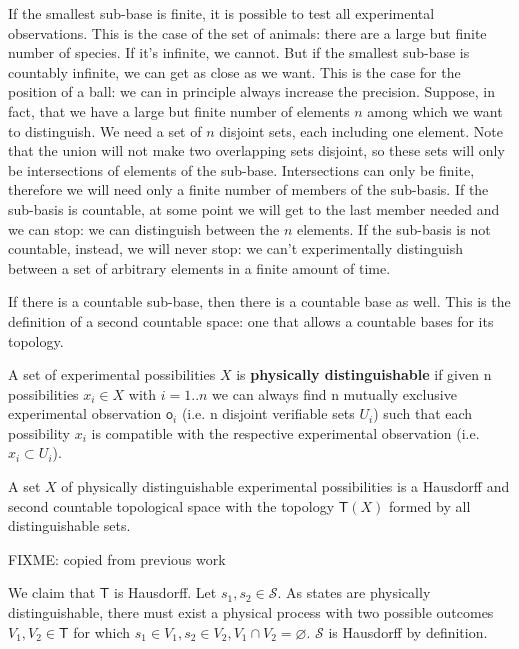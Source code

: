 \documentclass[11pt,letterpaper,fleqn]{memoir} %
\begin{document}
If the smallest sub-base is finite, it is possible to test all experimental observations. This is the case of the set of animals: there are a large but finite number of species. If it's infinite, we cannot. But if the smallest sub-base is countably infinite, we can get as close as we want. This is the case for the position of a ball: we can in principle always increase the precision. Suppose, in fact, that we have a large but finite number of elements $n$ among which we want to distinguish. We need a set of $n$ disjoint sets, each including one element. Note that the union will not make two overlapping sets disjoint, so these sets will only be intersections of elements of the sub-base. Intersections can only be finite, therefore we will need only a finite number of members of the sub-basis. If the sub-basis is countable, at some point we will get to the last member needed and we can stop: we can distinguish between the $n$ elements. If the sub-basis is not countable, instead, we will never stop: we can't experimentally distinguish between a set of arbitrary elements in a finite amount of time.

If there is a countable sub-base, then there is a countable base as well. This is the definition of a second countable space: one that allows a countable bases for its topology.

\begin{defn}
	A set of experimental possibilities $X$ is \textbf{physically distinguishable} if given n possibilities $x_i \in X$ with $i=1..n$ we can always find n mutually exclusive experimental observation $\mathsf{o}_i$ (i.e. n disjoint verifiable sets $U_i$) such that each possibility $x_i$ is compatible with the respective experimental observation (i.e. $x_i \subset U_i$).
\end{defn}


\begin{prop}
	A set $X$ of physically distinguishable experimental possibilities is a Hausdorff and second countable topological space with the topology $\mathsf{T}(X)$ formed by all distinguishable sets.
\end{prop}

\begin{justification}
	FIXME: copied from previous work
	
	We claim that $\mathsf{T}$ is Hausdorff. Let $s_1, s_2 \in \mathcal{S}$. As states are physically distinguishable, there must exist a physical process with two possible outcomes $V_1, V_2 \in \mathsf{T}$ for which $s_1 \in V_1, s_2 \in V_2, V_1 \cap V_2 = \varnothing$. $\mathcal{S}$ is Hausdorff by definition.
\end{justification}
\end{document}
